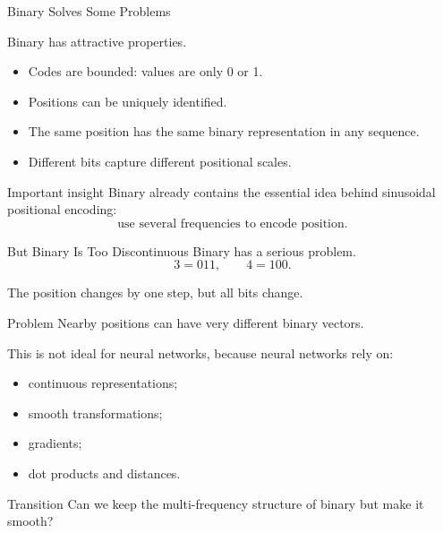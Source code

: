 \documentclass[aspectratio=169]{beamer}
\begin{document}
%
%
\begin{frame}{Binary Solves Some Problems}

Binary has attractive properties.

\medskip

\begin{itemize}
    \item Codes are bounded: values are only 0 or 1.
    \item Positions can be uniquely identified.
    \item The same position has the same binary representation in any sequence.
    \item Different bits capture different positional scales.
\end{itemize}

\medskip

\begin{block}{Important insight}
Binary already contains the essential idea behind sinusoidal positional encoding:
\[
\text{use several frequencies to encode position.}
\]
\end{block}

\end{frame}
%
%
\begin{frame}{But Binary Is Too Discontinuous}
\small
Binary has a serious problem.
\[
3 = 011,
\qquad
4 = 100.
\]

The position changes by one step, but all bits change.

\begin{alertblock}{Problem}
Nearby positions can have very different binary vectors.
\end{alertblock}

This is not ideal for neural networks, because neural networks rely on:

\begin{itemize}
    \item continuous representations;
    \item smooth transformations;
    \item gradients;
    \item dot products and distances.
\end{itemize}

\begin{block}{Transition}
Can we keep the multi-frequency structure of binary but make it smooth?
\end{block}

\end{frame}
\end{document}
